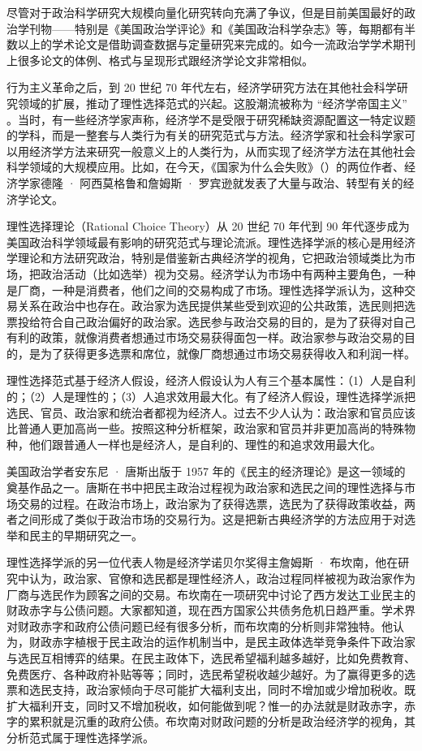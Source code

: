 尽管对于政治科学研究大规模向量化研究转向充满了争议，但是目前美国最好的政治学刊物——特别是《美国政治学评论》和《美国政治科学杂志》等，每期都有半数以上的学术论文是借助调查数据与定量研究来完成的。如今一流政治学学术期刊上很多论文的体例、格式与呈现形式跟经济学论文非常相似。

行为主义革命之后，到 20 世纪 70 年代左右，经济学研究方法在其他社会科学研究领域的扩展，推动了理性选择范式的兴起。这股潮流被称为 “经济学帝国主义” 。当时，有一些经济学家声称，经济学不是受限于研究稀缺资源配置这一特定议题的学科，而是一整套与人类行为有关的研究范式与方法。经济学家和社会科学家可以用经济学方法来研究一般意义上的人类行为，从而实现了经济学方法在其他社会科学领域的大规模应用。比如，在今天，《国家为什么会失败》（）的两位作者、经济学家德隆 · 阿西莫格鲁和詹姆斯 · 罗宾逊就发表了大量与政治、转型有关的经济学论文。

理性选择理论（Rational Choice Theory）从 20 世纪 70 年代到 90 年代逐步成为美国政治科学领域最有影响的研究范式与理论流派。理性选择学派的核心是用经济学理论和方法研究政治，特别是借鉴新古典经济学的视角，它把政治领域类比为市场，把政治活动（比如选举）视为交易。经济学认为市场中有两种主要角色，一种是厂商，一种是消费者，他们之间的交易构成了市场。理性选择学派认为，这种交易关系在政治中也存在。政治家为选民提供某些受到欢迎的公共政策，选民则把选票投给符合自己政治偏好的政治家。选民参与政治交易的目的，是为了获得对自己有利的政策，就像消费者想通过市场交易获得面包一样。政治家参与政治交易的目的，是为了获得更多选票和席位，就像厂商想通过市场交易获得收入和利润一样。

理性选择范式基于经济人假设，经济人假设认为人有三个基本属性：（1）人是自利的；（2）人是理性的；（3）人追求效用最大化。有了经济人假设，理性选择学派把选民、官员、政治家和统治者都视为经济人。过去不少人认为：政治家和官员应该比普通人更加高尚一些。按照这种分析框架，政治家和官员并非更加高尚的特殊物种，他们跟普通人一样也是经济人，是自利的、理性的和追求效用最大化。

美国政治学者安东尼 · 唐斯出版于 1957 年的《民主的经济理论》是这一领域的奠基作品之一。唐斯在书中把民主政治过程视为政治家和选民之间的理性选择与市场交易的过程。在政治市场上，政治家为了获得选票，选民为了获得政策收益，两者之间形成了类似于政治市场的交易行为。这是把新古典经济学的方法应用于对选举和民主的早期研究之一。

理性选择学派的另一位代表人物是经济学诺贝尔奖得主詹姆斯 · 布坎南，他在研究中认为，政治家、官僚和选民都是理性经济人，政治过程同样被视为政治家作为厂商与选民作为顾客之间的交易。布坎南在一项研究中讨论了西方发达工业民主的财政赤字与公债问题。大家都知道，现在西方国家公共债务危机日趋严重。学术界对财政赤字和政府公债问题已经有很多分析，而布坎南的分析则非常独特。他认为，财政赤字植根于民主政治的运作机制当中，是民主政体选举竞争条件下政治家与选民互相博弈的结果。在民主政体下，选民希望福利越多越好，比如免费教育、免费医疗、各种政府补贴等等；同时，选民希望税收越少越好。为了赢得更多的选票和选民支持，政治家倾向于尽可能扩大福利支出，同时不增加或少增加税收。既扩大福利开支，同时又不增加税收，如何能做到呢？惟一的办法就是财政赤字，赤字的累积就是沉重的政府公债。布坎南对财政问题的分析是政治经济学的视角，其分析范式属于理性选择学派。

